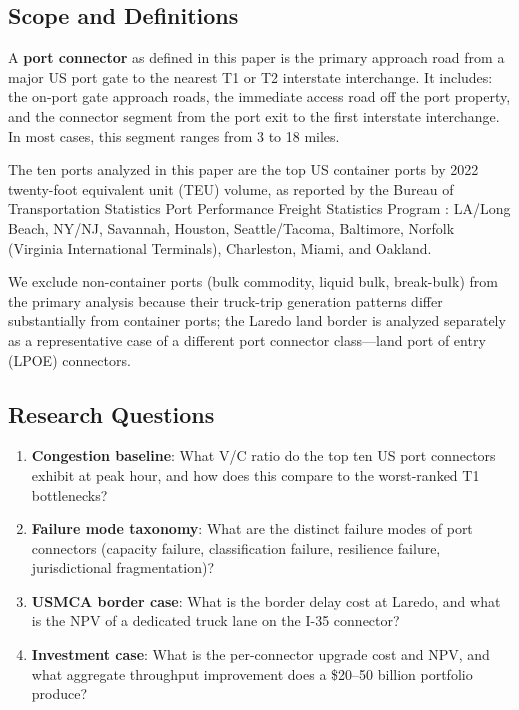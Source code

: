 \subsection{Scope and Definitions}

A \textbf{port connector} as defined in this paper is the primary approach road from a major US port gate to the nearest T1 or T2 interstate interchange. It includes: the on-port gate approach roads, the immediate access road off the port property, and the connector segment from the port exit to the first interstate interchange. In most cases, this segment ranges from 3 to 18 miles.

The ten ports analyzed in this paper are the top US container ports by 2022 twenty-foot equivalent unit (TEU) volume, as reported by the Bureau of Transportation Statistics Port Performance Freight Statistics Program \citep{BTS_airfreight2023}: LA/Long Beach, NY/NJ, Savannah, Houston, Seattle/Tacoma, Baltimore, Norfolk (Virginia International Terminals), Charleston, Miami, and Oakland.

We exclude non-container ports (bulk commodity, liquid bulk, break-bulk) from the primary analysis because their truck-trip generation patterns differ substantially from container ports; the Laredo land border is analyzed separately as a representative case of a different port connector class---land port of entry (LPOE) connectors.

\subsection{Research Questions}

\begin{enumerate}
  \item \textbf{Congestion baseline}: What V/C ratio do the top ten US port connectors exhibit at peak hour, and how does this compare to the worst-ranked T1 bottlenecks?
  \item \textbf{Failure mode taxonomy}: What are the distinct failure modes of port connectors (capacity failure, classification failure, resilience failure, jurisdictional fragmentation)?
  \item \textbf{USMCA border case}: What is the border delay cost at Laredo, and what is the NPV of a dedicated truck lane on the I-35 connector?
  \item \textbf{Investment case}: What is the per-connector upgrade cost and NPV, and what aggregate throughput improvement does a \$20--50 billion portfolio produce?
\end{enumerate}

